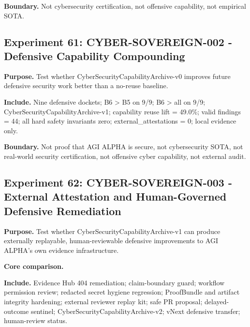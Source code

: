 \textbf{Boundary.} Not cybersecurity certification, not offensive
capability, not empirical SOTA.

\subsection{Experiment 61: CYBER-SOVEREIGN-002 - Defensive Capability
Compounding}\label{experiment-61-cyber-sovereign-002---defensive-capability-compounding}

\textbf{Purpose.} Test whether CyberSecurityCapabilityArchive-v0
improves future defensive security work better than a no-reuse baseline.

\textbf{Include.} Nine defensive dockets; B6 \textgreater{} B5 on 9/9;
B6 \textgreater{} all on 9/9; CyberSecurityCapabilityArchive-v1;
capability reuse lift = 49.0\%; valid findings = 44; all hard safety
invariants zero; external\_attestations = 0; local evidence only.

\textbf{Boundary.} Not proof that AGI ALPHA is secure, not cybersecurity
SOTA, not real-world security certification, not offensive cyber
capability, not external audit.

\subsection{Experiment 62: CYBER-SOVEREIGN-003 - External Attestation
and Human-Governed Defensive
Remediation}\label{experiment-62-cyber-sovereign-003---external-attestation-and-human-governed-defensive-remediation}

\textbf{Purpose.} Test whether CyberSecurityCapabilityArchive-v1 can
produce externally replayable, human-reviewable defensive improvements
to AGI ALPHA's own evidence infrastructure.

\textbf{Core comparison.}

\begin{Shaded}
\begin{Highlighting}[]
\end{Highlighting}
\end{Shaded}

\textbf{Include.} Evidence Hub 404 remediation; claim-boundary guard;
workflow permission review; redacted secret hygiene regression;
ProofBundle and artifact integrity hardening; external reviewer replay
kit; safe PR proposal; delayed-outcome sentinel;
CyberSecurityCapabilityArchive-v2; vNext defensive transfer;
human-review status.

